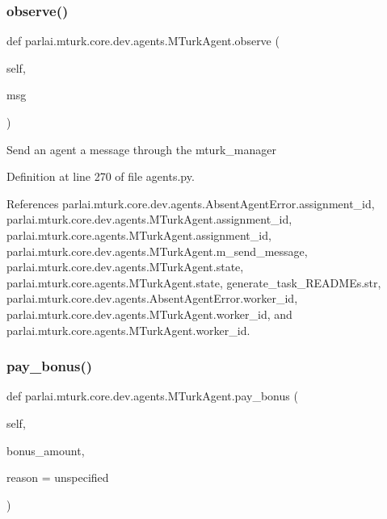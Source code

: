 \subsubsection{\texorpdfstring{observe()}{observe()}}
{\footnotesize\ttfamily def parlai.\+mturk.\+core.\+dev.\+agents.\+M\+Turk\+Agent.\+observe (\begin{DoxyParamCaption}\item[{}]{self,  }\item[{}]{msg }\end{DoxyParamCaption})}

\begin{DoxyVerb}Send an agent a message through the mturk_manager\end{DoxyVerb}
 

Definition at line 270 of file agents.\+py.



References parlai.\+mturk.\+core.\+dev.\+agents.\+Absent\+Agent\+Error.\+assignment\+\_\+id, parlai.\+mturk.\+core.\+dev.\+agents.\+M\+Turk\+Agent.\+assignment\+\_\+id, parlai.\+mturk.\+core.\+agents.\+M\+Turk\+Agent.\+assignment\+\_\+id, parlai.\+mturk.\+core.\+dev.\+agents.\+M\+Turk\+Agent.\+m\+\_\+send\+\_\+message, parlai.\+mturk.\+core.\+dev.\+agents.\+M\+Turk\+Agent.\+state, parlai.\+mturk.\+core.\+agents.\+M\+Turk\+Agent.\+state, generate\+\_\+task\+\_\+\+R\+E\+A\+D\+M\+Es.\+str, parlai.\+mturk.\+core.\+dev.\+agents.\+Absent\+Agent\+Error.\+worker\+\_\+id, parlai.\+mturk.\+core.\+dev.\+agents.\+M\+Turk\+Agent.\+worker\+\_\+id, and parlai.\+mturk.\+core.\+agents.\+M\+Turk\+Agent.\+worker\+\_\+id.

\mbox{\label{classparlai_1_1mturk_1_1core_1_1dev_1_1agents_1_1MTurkAgent_a9171ff6eb3ff172868987fafba8f8efc}} 
\subsubsection{\texorpdfstring{pay\+\_\+bonus()}{pay\_bonus()}}
{\footnotesize\ttfamily def parlai.\+mturk.\+core.\+dev.\+agents.\+M\+Turk\+Agent.\+pay\+\_\+bonus (\begin{DoxyParamCaption}\item[{}]{self,  }\item[{}]{bonus\+\_\+amount,  }\item[{}]{reason = {\ttfamily \textquotesingle{}unspecified\textquotesingle{}} }\end{DoxyParamCaption})}

